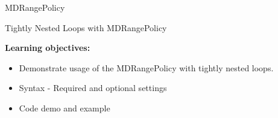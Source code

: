 \begin{frame}[fragile]{MDRangePolicy}

  {\Huge Tightly Nested Loops with MDRangePolicy}

  \vspace{20pt}

  \textbf{Learning objectives:}
  \begin{itemize}
    \item{Demonstrate usage of the MDRangePolicy with tightly nested loops.}
    \item{Syntax - Required and optional settings}
    \item{Code demo and example}
  \end{itemize}

  \vspace{-20pt}

\end{frame}


